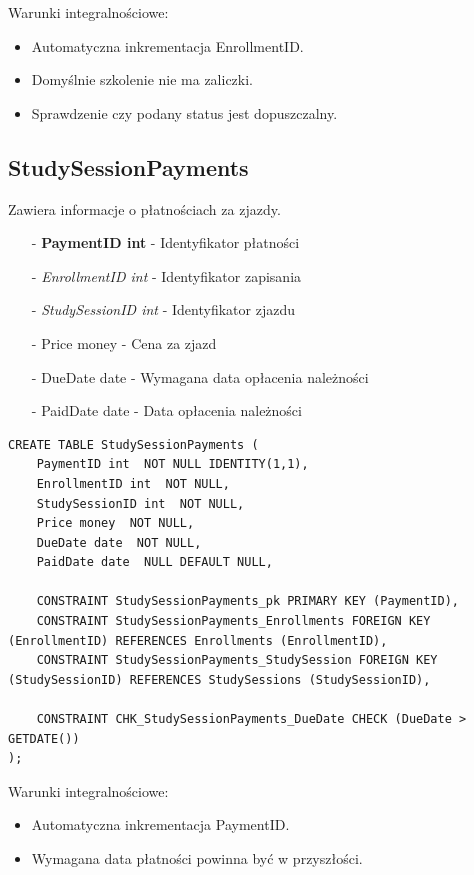 \documentclass[11pt,a4paper]{article}
\begin{document}
Warunki integralnościowe:
\begin{itemize}
    \item Automatyczna inkrementacja EnrollmentID.
    \item Domyślnie szkolenie nie ma zaliczki.
    \item Sprawdzenie czy podany status jest dopuszczalny.
\end{itemize}

\subsection{StudySessionPayments}
Zawiera informacje o płatnościach za zjazdy.

\begin{itemize}
    \item[-] \textbf{PaymentID int} - Identyfikator płatności
    \item[-] \textit{EnrollmentID int} - Identyfikator zapisania
    \item[-] \textit{StudySessionID int} - Identyfikator zjazdu
    \item[-] Price money - Cena za zjazd
    \item[-] DueDate date - Wymagana data opłacenia należności    
    \item[-] PaidDate date - Data opłacenia należności    
\end{itemize}

\begin{Verbatim}[breaklines=true]
CREATE TABLE StudySessionPayments (
    PaymentID int  NOT NULL IDENTITY(1,1),
    EnrollmentID int  NOT NULL,
    StudySessionID int  NOT NULL,  
    Price money  NOT NULL,
    DueDate date  NOT NULL,
    PaidDate date  NULL DEFAULT NULL,

    CONSTRAINT StudySessionPayments_pk PRIMARY KEY (PaymentID),
    CONSTRAINT StudySessionPayments_Enrollments FOREIGN KEY (EnrollmentID) REFERENCES Enrollments (EnrollmentID),
    CONSTRAINT StudySessionPayments_StudySession FOREIGN KEY (StudySessionID) REFERENCES StudySessions (StudySessionID),

    CONSTRAINT CHK_StudySessionPayments_DueDate CHECK (DueDate > GETDATE())
);
\end{Verbatim}

Warunki integralnościowe:
\begin{itemize}
    \item Automatyczna inkrementacja PaymentID.
    \item Wymagana data płatności powinna być w przyszłości.
\end{itemize}
\end{document}

